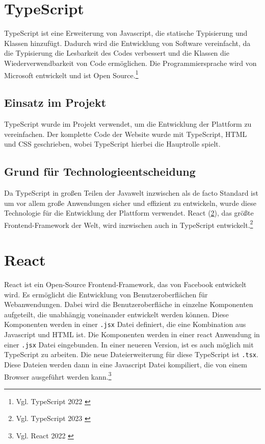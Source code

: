 \section{TypeScript}
\label{sec:typescript}

TypeScript ist eine Erweiterung von Javascript, die statische Typisierung und Klassen hinzufügt.
Dadurch wird die Entwicklung von Software vereinfacht, da die Typisierung die Lesbarkeit des Codes verbessert und die Klassen die Wiederverwendbarkeit von Code ermöglichen.
Die Programmiersprache wird von Microsoft entwickelt und ist Open Source.\footnote{Vgl. TypeScript 2022 \cite{typescript2022}}

\subsection{Einsatz im Projekt}
\label{sub:typescriptUsage}

TypeScript wurde im Projekt verwendet, um die Entwicklung der Plattform zu vereinfachen. Der komplette Code der Website wurde mit TypeScript, HTML und CSS geschrieben, wobei TypeScript hierbei die Hauptrolle spielt.

\subsection{Grund für Technologieentscheidung}
\label{sub:typescriptReason}

Da TypeScript in großen Teilen der Javawelt inzwischen als de facto Standard ist um vor allem große Anwendungen sicher und effizient zu entwickeln, wurde diese Technologie für die Entwicklung der Plattform verwendet.
React (\ref{sec:react}), das größte Frontend-Framework der Welt, wird inzwischen auch in TypeScript entwickelt.\footnote{Vgl. TypeScript 2023 \cite{typescript2023}}

\section{React}
\label{sec:react}

React ist ein Open-Source Frontend-Framework, das von Facebook entwickelt wird.
Es ermöglicht die Entwicklung von Benutzeroberflächen für Webanwendungen.
Dabei wird die Benutzeroberfläche in einzelne Komponenten aufgeteilt, die unabhängig voneinander entwickelt werden können.
Diese Komponenten werden in einer \texttt{.\gls{jsx}} Datei definiert, die eine Kombination aus Javascript und HTML ist.
Die Komponenten werden in einer \gls{react} Anwendung in einer \texttt{.\gls{jsx}} Datei eingebunden.
In einer neueren Version, ist es auch möglich mit TypeScript zu arbeiten.
 Die neue Dateierweiterung für diese TypeScript ist \texttt{.\gls{tsx}}.
Diese Dateien werden dann in eine Javascript Datei kompiliert, die von einem Browser ausgeführt werden kann.\footnote{Vgl. React 2022 \cite{react2022}}

